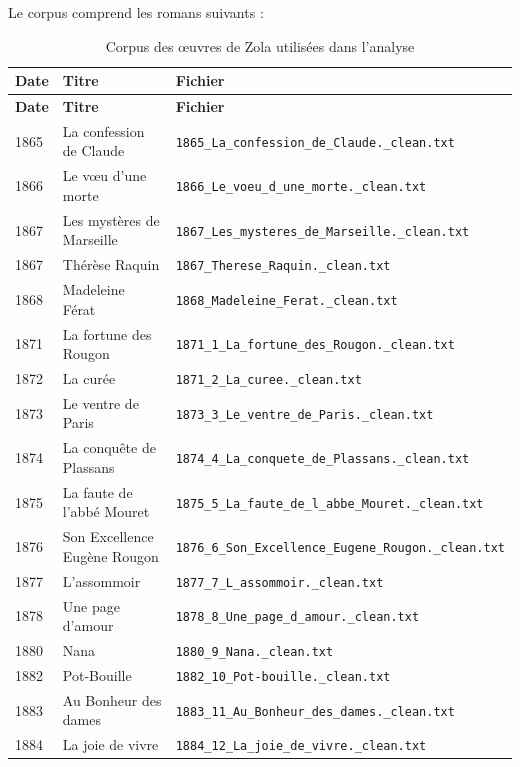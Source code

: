 \documentclass{article}
\begin{document}
Le corpus comprend les romans suivants :

\begin{longtable}{p{1.6cm}p{4.2cm}p{8cm}}
\caption{Corpus des œuvres de Zola utilisées dans l'analyse}\\
\toprule
\textbf{Date} & \textbf{Titre} & \textbf{Fichier} \\
\midrule
\endfirsthead

\toprule
\textbf{Date} & \textbf{Titre} & \textbf{Fichier} \\
\midrule
\endhead

1865 & La confession de Claude & \texttt{1865\_La\_confession\_de\_Claude.\_clean.txt} \\
1866 & Le vœu d'une morte & \texttt{1866\_Le\_voeu\_d\_une\_morte.\_clean.txt} \\
1867 & Les mystères de Marseille & \texttt{1867\_Les\_mysteres\_de\_Marseille.\_clean.txt} \\
1867 & Thérèse Raquin & \texttt{1867\_Therese\_Raquin.\_clean.txt} \\
1868 & Madeleine Férat & \texttt{1868\_Madeleine\_Ferat.\_clean.txt} \\
1871 & La fortune des Rougon & \texttt{1871\_1\_La\_fortune\_des\_Rougon.\_clean.txt} \\
1872 & La curée & \texttt{1871\_2\_La\_curee.\_clean.txt} \\
1873 & Le ventre de Paris & \texttt{1873\_3\_Le\_ventre\_de\_Paris.\_clean.txt} \\
1874 & La conquête de Plassans & \texttt{1874\_4\_La\_conquete\_de\_Plassans.\_clean.txt} \\
1875 & La faute de l'abbé Mouret & \texttt{1875\_5\_La\_faute\_de\_l\_abbe\_Mouret.\_clean.txt} \\
1876 & Son Excellence Eugène Rougon & \texttt{1876\_6\_Son\_Excellence\_Eugene\_Rougon.\_clean.txt} \\
1877 & L'assommoir & \texttt{1877\_7\_L\_assommoir.\_clean.txt} \\
1878 & Une page d'amour & \texttt{1878\_8\_Une\_page\_d\_amour.\_clean.txt} \\
1880 & Nana & \texttt{1880\_9\_Nana.\_clean.txt} \\
1882 & Pot-Bouille & \texttt{1882\_10\_Pot-bouille.\_clean.txt} \\
1883 & Au Bonheur des dames & \texttt{1883\_11\_Au\_Bonheur\_des\_dames.\_clean.txt} \\
1884 & La joie de vivre & \texttt{1884\_12\_La\_joie\_de\_vivre.\_clean.txt} \\

\end{longtable}
\end{document}
